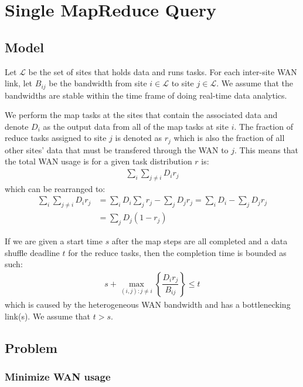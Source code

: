 \section{Single MapReduce Query}

\subsection{Model}

Let $\mathcal{L}$ be the set of sites that holds data and runs tasks.
For each inter-site WAN link, let $B_{ij}$ be the bandwidth from site $i\in\mathcal{L}$ to site $j\in\mathcal{L}$.
We assume that the bandwidths are stable within the time frame of doing real-time data analytics.

We perform the map tasks at the sites that contain the associated data and denote $D_{i}$ as the output data from all of the map tasks at site $i$.
The fraction of reduce tasks assigned to site $j$ is denoted as $r_{j}$ which is also the fraction of all other sites' data that must be transfered through the WAN to $j$.
This means that the total WAN usage is for a given task distribution $r$ is:
\begin{align}
	\sum_{i}\sum_{j\neq i}D_{i}r_{j}
\end{align}
which can be rearranged to:
\begin{align}
	\sum_{i}\sum_{j\neq i}D_ir_j & = \sum_{i}D_i\sum_{j}r_j - \sum_{j}D_jr_j =\sum_{i}D_i - \sum_{j}D_jr_j \\
	& =\sum_{j}D_j(1-r_j)
\end{align}

If we are given a start time $s$ after the map steps are all completed and a data shuffle deadline $t$ for the reduce tasks, then the completion time is bounded as such:
\begin{align}
	s + \max_{(i,j):j\neq i} \left\{\dfrac{D_{i}r_{j}}{B_{ij}}\right\} \leq t
\end{align}
which is caused by the heterogeneous WAN bandwidth and has a bottlenecking link(s).
We assume that $t>s$.

\subsection{Problem}

\subsubsection*{Minimize WAN usage}

